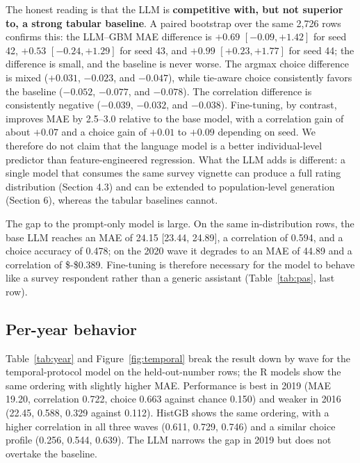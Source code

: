 The honest reading is that the LLM is \textbf{competitive with, but not
superior to, a strong tabular baseline}. A paired bootstrap over the
same 2,726 rows confirms this: the LLM--GBM MAE difference is \(+0.69\)
\([-0.09, +1.42]\) for seed 42, \(+0.53\) \([-0.24, +1.29]\) for seed
43, and \(+0.99\) \([+0.23, +1.77]\) for seed 44; the difference is
small, and the baseline is never worse. The argmax choice difference is
mixed (\(+0.031\), \(-0.023\), and \(-0.047\)), while tie-aware choice
consistently favors the baseline (\(-0.052\), \(-0.077\), and
\(-0.078\)). The correlation difference is consistently negative
(\(-0.039\), \(-0.032\), and \(-0.038\)). Fine-tuning, by contrast,
improves MAE by 2.5--3.0 relative to the base model, with a correlation
gain of about \(+0.07\) and a choice gain of \(+0.01\) to \(+0.09\)
depending on seed. We therefore do not claim that the language model is
a better individual-level predictor than feature-engineered regression.
What the LLM adds is different: a single model that consumes the same
survey vignette can produce a full rating distribution (Section 4.3) and
can be extended to population-level generation (Section 6), whereas the
tabular baselines cannot.

The gap to the prompt-only model is large. On the same in-distribution
rows, the base LLM reaches an MAE of 24.15 {[}23.44, 24.89{]}, a
correlation of 0.594, and a choice accuracy of 0.478; on the 2020 wave
it degrades to an MAE of 44.89 and a correlation of \$-\$0.389.
Fine-tuning is therefore necessary for the model to behave like a survey
respondent rather than a generic assistant (Table~\ref{tab:pas}, last row).

\subsection{Per-year behavior}\label{per-year-behavior}

Table~\ref{tab:year} and Figure~\ref{fig:temporal} break the result down by wave for the
temporal-protocol model on the held-out-number rows; the R models show
the same ordering with slightly higher MAE. Performance is best in 2019
(MAE 19.20, correlation 0.722, choice 0.663 against chance 0.150) and
weaker in 2016 (22.45, 0.588, 0.329 against 0.112). HistGB shows the
same ordering, with a higher correlation in all three waves (0.611,
0.729, 0.746) and a similar choice profile (0.256, 0.544, 0.639). The
LLM narrows the gap in 2019 but does not overtake the baseline.




